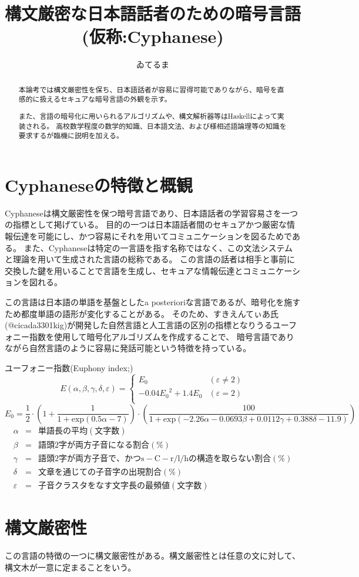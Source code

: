 \documentclass{jsarticle}
\title{構文厳密な日本語話者のための暗号言語(仮称:Cyphanese)}
\author{ゐてるま}
\begin{document}
    \maketitle
    \begin{abstract}
        本論考では構文厳密性を保ち、日本語話者が容易に習得可能でありながら、暗号を直感的に扱えるセキュアな暗号言語の外観を示す。
        
        また、言語の暗号化に用いられるアルゴリズムや、構文解析器等はHaskellによって実装される。
        高校数学程度の数学的知識、日本語文法、および様相述語論理等の知識を要求するが臨機に説明を加える。
    \end{abstract}

    \section{Cyphaneseの特徴と概観}
    Cyphaneseは構文厳密性を保つ暗号言語であり、日本語話者の学習容易さを一つの指標として掲げている。
    目的の一つは日本語話者間のセキュアかつ厳密な情報伝達を可能にし、かつ容易にそれを用いてコミュニケーションを図るためである。
    また、Cyphaneseは特定の一言語を指す名称ではなく、この文法システムと理論を用いて生成された言語の総称である。
    この言語の話者は相手と事前に交換した鍵を用いることで言語を生成し、セキュアな情報伝達とコミュニケーションを図れる。
    
    この言語は日本語の単語を基盤としたa posterioriな言語であるが、暗号化を施すため都度単語の語形が変化することがある。
    そのため、すきえんてぃあ氏(@cicada3301\underline{\quad}kig)が開発した自然言語と人工言語の区別の指標となりうるユーフォニー指数を使用して暗号化アルゴリズムを作成することで、
    暗号言語でありながら自然言語のように容易に発話可能という特徴を持っている。
    \begin{itembox}[c]{ユーフォニー指数(Euphony index;)} 
        \[E (\alpha, \beta, \gamma, \delta, \varepsilon) = \begin{cases}
            E_0 & (\varepsilon \not = 2) \\
            -0.04{E_0}^2 + 1.4E_0 & (\varepsilon = 2) \\
        \end{cases} \]
        \[ E_0 = \frac{1}{2} \cdot \left( 1 + \frac{1}{1 + \mathrm{exp}(0.5 \alpha - 7)} \right) \cdot \left( \frac{100}{1 + \mathrm{exp}(-2.26 \alpha - 0.0693 \beta + 0.0112 \gamma + 0.388 \delta - 11.9)} \right)\]
        \begin{eqnarray*}
            \alpha & = & 単語長の平均 (文字数)\\
            \beta & = & 語頭2字が両方子音になる割合 (\%)\\
            \gamma & = & 語頭2字が両方子音で、かつ \mathrm{s-C-r/l/h} の構造を取らない割合 (\%)\\
            \delta & = & 文章を通じての子音字の出現割合(\%)\\
            \varepsilon & = & 子音クラスタをなす文字長の最頻値(文字数)
        \end{eqnarray*}
    \end{itembox}

    \section{構文厳密性}
    この言語の特徴の一つに構文厳密性がある。構文厳密性とは任意の文に対して、構文木が一意に定まることをいう。
    
\end{document}
